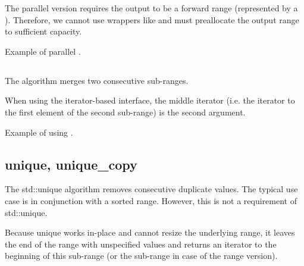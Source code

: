 The parallel version requires the output to be a forward range (represented by a ). Therefore, we cannot use wrappers like  and must preallocate the output range to sufficient capacity.

\begin{box-note}
\footnotesize Example of parallel .
\tcblower
{}
\end{box-note}

\subsection{\texorpdfstring{}{\texttt{std::inplace\_merge}}}

The  algorithm merges two consecutive sub-ranges.


When using the iterator-based interface, the middle iterator (i.e. the iterator to the first element of the second sub-range) is the second argument.

\begin{box-note}
\footnotesize Example of using .
\tcblower
{}
\end{box-note}
\subsection{unique, unique\_copy}

The std::unique algorithm removes consecutive duplicate values. The typical use case is in conjunction with a sorted range. However, this is not a requirement of std::unique.



Because unique works in-place and cannot resize the underlying range, it leaves the end of the range with unspecified values and returns an iterator to the beginning of this sub-range (or the sub-range in case of the range version).

